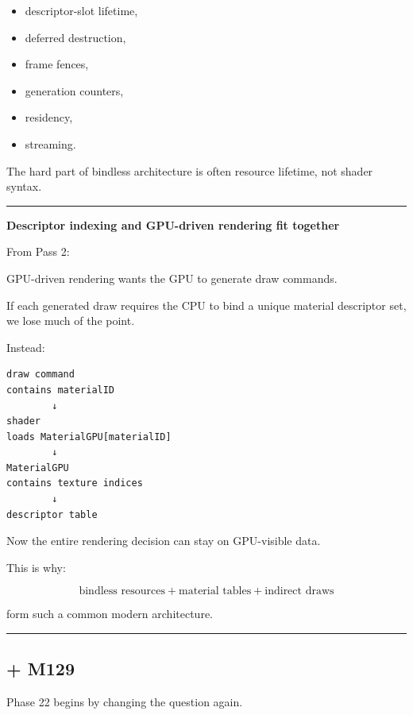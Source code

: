 \begin{itemize}
\tightlist
\item
  descriptor-slot lifetime,
\item
  deferred destruction,
\item
  frame fences,
\item
  generation counters,
\item
  residency,
\item
  streaming.
\end{itemize}

The hard part of bindless architecture is often resource lifetime, not shader syntax.

\begin{center}\rule{0.5\linewidth}{0.5pt}\end{center}

\textbf{Descriptor indexing and GPU-driven rendering fit together}

From Pass 2:

GPU-driven rendering wants the GPU to generate draw commands.

If each generated draw requires the CPU to bind a unique material descriptor set, we lose much of the point.

Instead:

\begin{verbatim}
draw command
contains materialID
        ↓
shader
loads MaterialGPU[materialID]
        ↓
MaterialGPU
contains texture indices
        ↓
descriptor table
\end{verbatim}

Now the entire rendering decision can stay on GPU-visible data.

This is why:

\[
\boxed{
\text{bindless resources}
+
\text{material tables}
+
\text{indirect draws}
}
\]

form such a common modern architecture.

\begin{center}\rule{0.5\linewidth}{0.5pt}\end{center}

\subsection{+ M129}\label{01-foundations-i-ch008-m129}

\hypertarget{01-foundations-i-ch008-m129}{}

Phase 22 begins by changing the question again.

